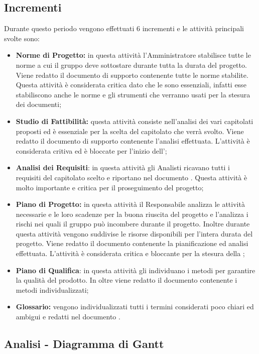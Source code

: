 \documentclass[PianoDiProgetto.tex]{subfiles}
\begin{document}
\subsection{Incrementi}
Durante questo periodo vengono effettuati 6 incrementi e le attività principali svolte sono:
\begin{itemize}
	\item \textbf{Norme di Progetto:}
	in questa attività l'Amministratore stabilisce tutte le norme a cui il gruppo \gruppo deve sottostare durante tutta la durata del progetto. Viene redatto il documento di supporto \ndp contenente tutte le norme stabilite. Questa attività è considerata critica dato che le \ndp sono essenziali, infatti esse stabiliscono anche le norme e gli strumenti che verranno usati per la stesura dei documenti;
	
	
	\item \textbf{Studio di Fattibilità:} 
	questa attività consiste nell'analisi dei vari capitolati proposti ed è essenziale per la scelta del capitolato che verrà svolto. Viene redatto il documento di supporto \sdf contenente l'analisi effettuata. L'attività è considerata critiva ed è bloccate per l'inizio dell'\adr;
		
	\item \textbf{Analisi dei Requisiti}: 
		in questa attività gli Analisti ricavano tutti i requisiti del capitolato scelto e riportano nel documento \adr. Questa attività è molto importante e critica per il proseguimento del progetto;
	
	\item \textbf{Piano di Progetto:} in questa attività il Responsabile analizza le attività necessarie e le loro scadenze per la buona riuscita del progetto e l'\amme analizza i rischi nei quali il gruppo \gruppo può incombere durante il progetto.  Inoltre durante questa attività vengono suddivise le risorse disponibili per l'intera durata del progetto. Viene redatto il documento \pdp contenente la pianificazione ed analisi effettuata. L'attività è considerata critica e bloccante per la stesura della ;
	\item \textbf{Piano di Qualifica}: in questa attività gli \ammi individuano i metodi per garantire la qualità del prodotto. In oltre viene redatto il documento \pdq contenente i metodi individualizzati;
	\item \textbf{Glossario:} vengono individualizzati tutti i termini considerati poco chiari ed ambigui e redatti nel documento \g.
		
\end{itemize}	 
\begin{landscape}
\subsection{Analisi - Diagramma di Gantt}
\end{landscape}	
\end{document}
